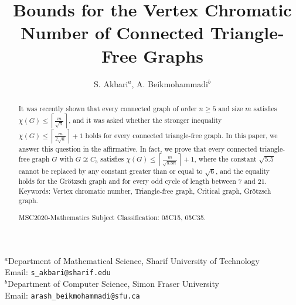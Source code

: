 \documentclass{amsart}
\theoremstyle{plain}
\begin{document}
\title{Bounds for the Vertex Chromatic Number of Connected Triangle-Free Graphs}


\author{S. Akbari$^{a}$, A. Beikmohammadi$^{b}$ \smallskip}

\maketitle

\begin{center}
$^a$Department of Mathematical Science, Sharif University of Technology \\
Email: \texttt{s\_akbari@sharif.edu} \\

\medskip
$^b$Department of Computer Science, Simon Fraser University \\
Email: \texttt{arash\_beikmohammadi@sfu.ca} \\
\end{center}

\begin{abstract}
It was recently shown that every connected graph of order $n \geq 5$ and size $m$ satisfies $\chi(G) \leq \left\lceil \frac{m}{\sqrt{n}} \right\rceil$, and it was asked whether the stronger inequality $\chi(G) \leq \left\lceil \frac{m}{2\sqrt{n}} \right\rceil + 1$ holds for every connected triangle-free graph. In this paper, we answer this question in the affirmative. In fact, we prove that every connected triangle-free graph $G$ with $G \not\cong C_5$ satisfies $\chi(G) \leq \left\lceil \frac{m}{\sqrt{5.5n}} \right\rceil + 1$, where the constant $\sqrt{5.5}$ cannot be replaced by any constant greater than or equal to $\sqrt{6}$, and the equality holds for the Gr\"{o}tzsch graph and for every odd cycle of length between $7$ and $21$. \\

\noindent Keywords: Vertex chromatic number, Triangle-free graph, Critical graph, Gr\"{o}tzsch graph.

\noindent MSC2020-Mathematics Subject Classification: 05C15, 05C35.
\end{abstract}
\end{document}
